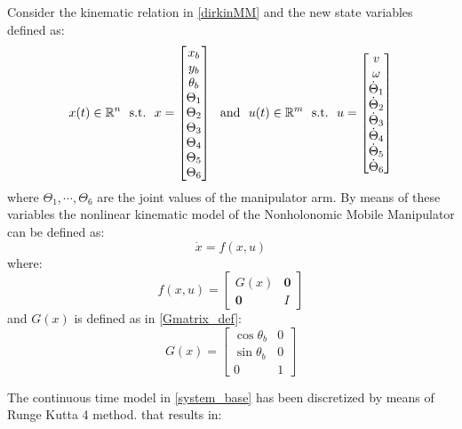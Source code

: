 Consider the kinematic relation in \ref{dirkinMM} and the new state variables defined as:
\begin{equation}
{x}(t) \in \mathbb{R}^n\ \  \textnormal{s.t.}\ \  {x}  = \left[ \begin{matrix} x_b \\ y_b \\ \theta_b \\ \Theta_1 \\ \Theta_2 \\ \Theta_3 \\ \Theta_4 \\ \Theta_5 \\ \Theta_6 \end{matrix} \right]\ \   \textnormal{and}\ \  {u}(t) \in \mathbb{R}^m\ \ \textnormal{s.t.}\ \ {u}=\left[ \begin{matrix} v \\ \omega \\ \dot{\Theta}_1 \\ \dot{\Theta}_2 \\ \dot{\Theta}_3 \\ \dot{\Theta}_4 \\ \dot{\Theta}_5 \\ \dot{\Theta}_6 \end{matrix} \right]
\end{equation}
where $\Theta_1, \cdots,\Theta_6$ are the joint values of the manipulator arm.
By means of these variables the nonlinear kinematic model of the Nonholonomic Mobile Manipulator can be defined as:
\begin{equation} \label{system_base}
	\dot{{x}}=f({x},{u})
\end{equation} 
where:
\begin{equation} \label{NLsystem}
	f({x},{u}) = \left[ \begin{matrix}
	G({x}) & \textbf{0} \\ \textbf{0} & I \end{matrix} \right]
\end{equation}
and $G(x)$ is defined as in \ref{Gmatrix_def}:
\begin{equation*}
G({x}) =  \left[
\begin{matrix}
\cos\theta_b & 0 \\
\sin\theta_b & 0 \\
0 & 1 
\end{matrix}
\right] 
\end{equation*}

The continuous time model in \ref{system_base} has been discretized by means of Runge Kutta 4 method. that results in: 

